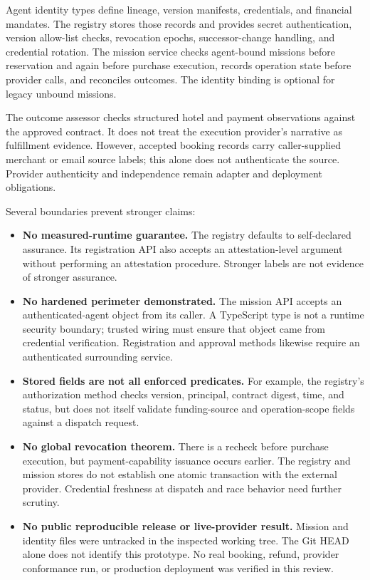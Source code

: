 \documentclass[
  11pt,
  letterpaper,
]{article}
\providecommand{\tightlist}{%
  \setlength{\itemsep}{0pt}\setlength{\parskip}{0pt}}
\begin{document}
Agent identity types define lineage, version manifests, credentials, and
financial mandates. The registry stores those records and provides
secret authentication, version allow-list checks, revocation epochs,
successor-change handling, and credential rotation. The mission service
checks agent-bound missions before reservation and again before purchase
execution, records operation state before provider calls, and reconciles
outcomes. The identity binding is optional for legacy unbound missions.

The outcome assessor checks structured hotel and payment observations
against the approved contract. It does not treat the execution
provider's narrative as fulfillment evidence. However, accepted booking
records carry caller-supplied merchant or email source labels; this
alone does not authenticate the source. Provider authenticity and
independence remain adapter and deployment obligations.

Several boundaries prevent stronger claims:

\begin{itemize}
\tightlist
\item
  \textbf{No measured-runtime guarantee.} The registry defaults to
  self-declared assurance. Its registration API also accepts an
  attestation-level argument without performing an attestation
  procedure. Stronger labels are not evidence of stronger assurance.
\item
  \textbf{No hardened perimeter demonstrated.} The mission API accepts
  an authenticated-agent object from its caller. A TypeScript type is
  not a runtime security boundary; trusted wiring must ensure that
  object came from credential verification. Registration and approval
  methods likewise require an authenticated surrounding service.
\item
  \textbf{Stored fields are not all enforced predicates.} For example,
  the registry's authorization method checks version, principal,
  contract digest, time, and status, but does not itself validate
  funding-source and operation-scope fields against a dispatch request.
\item
  \textbf{No global revocation theorem.} There is a recheck before
  purchase execution, but payment-capability issuance occurs earlier.
  The registry and mission stores do not establish one atomic
  transaction with the external provider. Credential freshness at
  dispatch and race behavior need further scrutiny.
\item
  \textbf{No public reproducible release or live-provider result.}
  Mission and identity files were untracked in the inspected working
  tree. The Git HEAD alone does not identify this prototype. No real
  booking, refund, provider conformance run, or production deployment
  was verified in this review.
\end{itemize}
\end{document}

